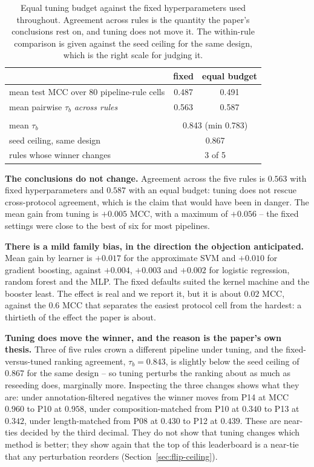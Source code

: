 \documentclass[11pt,a4paper]{article}
\begin{document}
\begin{table}[htbp]\centering\small
\caption{Equal tuning budget against the fixed hyperparameters used throughout. Agreement
across rules is the quantity the paper's conclusions rest on, and tuning does not move it.
The within-rule comparison is given against the seed ceiling for the same design, which is
the right scale for judging it.}
\label{tab:tuning}
\begin{tabular}{lcc}
\toprule
 & fixed & equal budget \\
\midrule
mean test MCC over 80 pipeline-rule cells & 0.487 & 0.491 \\
mean pairwise $\tau_b$ \emph{across rules} & 0.563 & 0.587 \\
\addlinespace
\multicolumn{3}{l}{\emph{within-rule, fixed ranking against tuned ranking}} \\
\quad mean $\tau_b$ & \multicolumn{2}{c}{0.843 \quad(min 0.783)} \\
\quad seed ceiling, same design & \multicolumn{2}{c}{0.867} \\
\quad rules whose winner changes & \multicolumn{2}{c}{3 of 5} \\
\bottomrule
\end{tabular}
\end{table}

\textbf{The conclusions do not change.} Agreement across the five rules is $0.563$ with
fixed hyperparameters and $0.587$ with an equal budget: tuning does not rescue
cross-protocol agreement, which is the claim that would have been in danger. The mean gain
from tuning is $+0.005$ MCC, with a maximum of $+0.056$ -- the fixed settings were close to
the best of six for most pipelines.

\textbf{There is a mild family bias, in the direction the objection anticipated.} Mean gain
by learner is $+0.017$ for the approximate SVM and $+0.010$ for gradient boosting, against
$+0.004$, $+0.003$ and $+0.002$ for logistic regression, random forest and the MLP. The
fixed defaults suited the kernel machine and the booster least. The effect is real and we
report it, but it is about $0.02$ MCC, against the $0.6$ MCC that separates the easiest
protocol cell from the hardest: a thirtieth of the effect the paper is about.

\textbf{Tuning does move the winner, and the reason is the paper's own thesis.} Three of
five rules crown a different pipeline under tuning, and the fixed-versus-tuned ranking
agreement, $\tau_b = 0.843$, is slightly below the seed ceiling of $0.867$ for the same
design -- so tuning perturbs the ranking about as much as reseeding does, marginally more.
Inspecting the three changes shows what they are: under annotation-filtered negatives the
winner moves from P14 at MCC $0.960$ to P10 at $0.958$, under composition-matched from P10
at $0.340$ to P13 at $0.342$, under length-matched from P08 at $0.430$ to P12 at $0.439$.
These are near-ties decided by the third decimal. They do not show that tuning changes
which method is better; they show again that the top of this leaderboard is a near-tie that
any perturbation reorders (Section~\ref{sec:flip-ceiling}).
\end{document}
